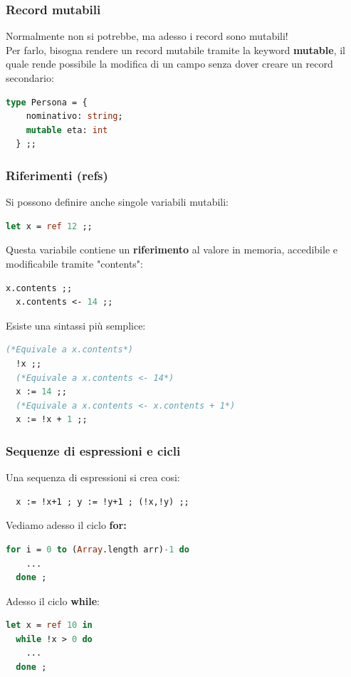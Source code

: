 \documentclass[12pt,a4paper]{article}
\begin{document}
\subsubsection{Record mutabili}
Normalmente non si potrebbe, ma adesso i record sono mutabili!\\
Per farlo, bisogna rendere un record mutabile tramite la keyword \textbf{mutable}, il quale rende possibile la modifica di un campo senza dover creare un record secondario:
\begin{lstlisting}[language=OCaml]
  type Persona = {
    nominativo: string;
    mutable eta: int
  } ;;
\end{lstlisting}

\subsubsection{Riferimenti (refs)}
Si possono definire anche singole variabili mutabili:
\begin{lstlisting}[language=OCaml]
  let x = ref 12 ;;
\end{lstlisting}
Questa variabile contiene un \textbf{riferimento} al valore in memoria, accedibile e modificabile tramite "contents":
\begin{lstlisting}[language=OCaml]
  x.contents ;;
  x.contents <- 14 ;;
\end{lstlisting}
Esiste una sintassi più semplice:
\begin{lstlisting}[language=OCaml]
  (*Equivale a x.contents*)
  !x ;;
  (*Equivale a x.contents <- 14*)
  x := 14 ;;
  (*Equivale a x.contents <- x.contents + 1*)
  x := !x + 1 ;;
\end{lstlisting}

\subsubsection{Sequenze di espressioni e cicli}
Una sequenza di espressioni si crea cosi:
\begin{lstlisting}
  x := !x+1 ; y := !y+1 ; (!x,!y) ;;
\end{lstlisting}
Vediamo adesso il ciclo \textbf{for:}
\begin{lstlisting}[language=OCaml]
  for i = 0 to (Array.length arr)-1 do
    ...
  done ;
\end{lstlisting}
Adesso il ciclo \textbf{while}:
\begin{lstlisting}[language=OCaml]
  let x = ref 10 in
  while !x > 0 do
    ...
  done ;
\end{lstlisting}
\end{document}
